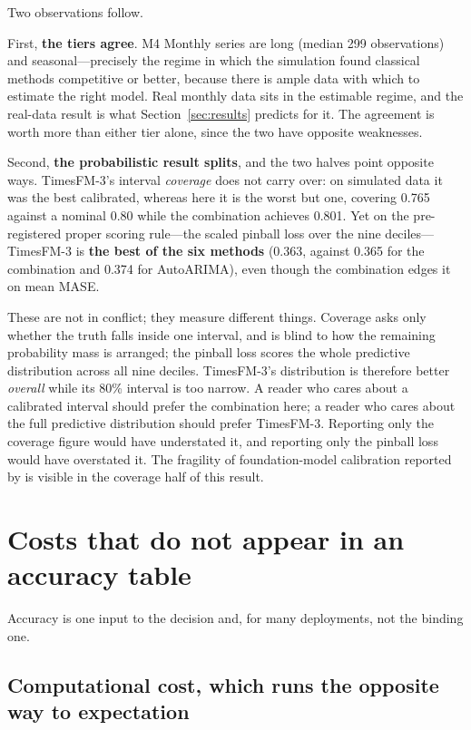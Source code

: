 \documentclass[article]{ajs}
\providecommand{\sectionref}[1]{Section~\ref{#1}}
\begin{document}
Two observations follow.

First, \textbf{the tiers agree}. M4 Monthly series are long (median 299 observations) and
seasonal---precisely the regime in which the simulation found classical methods competitive or
better, because there is ample data with which to estimate the right model. Real monthly data
sits in the estimable regime, and the real-data result is what \sectionref{sec:results} predicts
for it. The agreement is worth more than either tier alone, since the two have opposite
weaknesses.

Second, \textbf{the probabilistic result splits}, and the two halves point opposite ways.
TimesFM-3's interval \emph{coverage} does not carry over: on simulated data it was the best
calibrated, whereas here it is the worst but one, covering 0.765 against a nominal 0.80 while the
combination achieves 0.801. Yet on the pre-registered proper scoring rule---the scaled pinball
loss over the nine deciles---TimesFM-3 is \textbf{the best of the six methods} (0.363, against
0.365 for the combination and 0.374 for AutoARIMA), even though the combination edges it on mean
MASE.

These are not in conflict; they measure different things. Coverage asks only whether the truth
falls inside one interval, and is blind to how the remaining probability mass is arranged; the
pinball loss scores the whole predictive distribution across all nine deciles. TimesFM-3's
distribution is therefore better \emph{overall} while its 80\% interval is too narrow. A reader
who cares about a calibrated interval should prefer the combination here; a reader who cares
about the full predictive distribution should prefer TimesFM-3. Reporting only the coverage
figure would have understated it, and reporting only the pinball loss would have overstated it.
The fragility of foundation-model calibration reported by \citet{adler2026calibrated} is visible
in the coverage half of this result.

\section{Costs that do not appear in an accuracy table}
\label{sec:licence}

Accuracy is one input to the decision and, for many deployments, not the binding one.

\subsection{Computational cost, which runs the opposite way to expectation}
\end{document}
